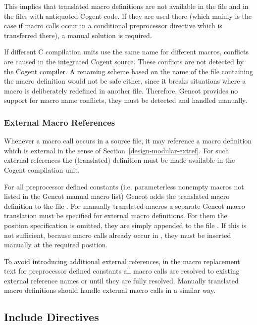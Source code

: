 This implies that translated macro definitions are not available in the file  and in the files with
antiquoted Cogent code. If they are used there (which mainly is the case if macro calls occur in a conditional
preprocessor directive which is transferred there), a manual solution is required.

If different C compilation units use the same name for different macros, conflicts are caused in the integrated Cogent
source. These conflicts are not detected by the Cogent compiler. A renaming scheme based on the name of the file 
containing the macro definition would not be safe either, since it breaks situations where a macro is deliberately
redefined in another file. Therefore, Gencot provides no support for macro name conflicts, they must be detected and
handled manually.

\subsubsection{External Macro References}

Whenever a macro call occurs in a source file, it may reference a macro definition which is external in 
the sense of Section~\ref{design-modular-extref}. For such external references the (translated) definition 
must be made available in the Cogent compilation unit.

For all preprocessor defined constants (i.e. parameterless nonempty macros not listed in the Gencot manual 
macro list) Gencot adds the translated macro definition to the file . For
manually translated macros a separate Gencot macro translation must be specified for external macro definitions.
For them the position specification is omitted, they are simply appended to the file 
. If this is not sufficient, because macro calls already occur in 
, they must be inserted manually at the required position.

To avoid introducing additional external references, in the macro replacement text for preprocessor defined 
constants all macro calls are resolved to existing external reference names or until they are fully resolved.
Manually translated macro definitions should handle external macro calls in a similar way.

\subsection{Include Directives}

